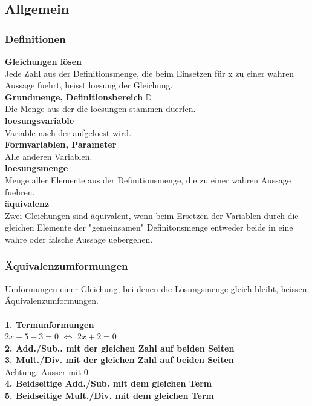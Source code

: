 \begin{multicols}{2}
    \subsection{Allgemein}
    \vspace{-4mm}
    \subsubsection{Definitionen}
    \vspace{-4mm}
    \textbf{Gleichungen lösen} \\
    Jede Zahl aus der Definitionsmenge, die beim Einsetzen für x zu einer wahren Aussage fuehrt, heisst loesung der Gleichung. \\
    \textbf{Grundmenge, Definitionsbereich} $\mathbb{D}$ \\
    Die Menge aus der die loesungen stammen duerfen. \\
    \textbf{loesungsvariable} \\
    Variable nach der aufgeloest wird. \\
    \textbf{Formvariablen, Parameter} \\
    Alle anderen Variablen. \\
    \textbf{loesungsmenge} \\
    Menge aller Elemente aus der Definitionsmenge, die zu einer wahren Aussage fuehren. \\
    \textbf{äquivalenz} \\
    Zwei Gleichungen sind äquivalent, wenn beim Ersetzen der Variablen durch die gleichen Elemente der "gemeinsamen" Definitonsmenge entweder beide in eine wahre oder falsche Aussage uebergehen.

    \subsubsection{Äquivalenzumformungen}
    \vspace{-4mm}
    Umformungen einer Gleichung, bei denen die Lösungsmenge gleich bleibt, heissen Äquivalenzumformungen.\\~\\
    \textbf{1. Termunformungen}\\
    $2x+5-3=0$ $\Longleftrightarrow$ $2x +2 = 0$ \\
    \textbf{2. Add./Sub.. mit der gleichen Zahl auf beiden Seiten} \\
    \textbf{3. Mult./Div. mit der gleichen Zahl auf beiden Seiten} \\
    Achtung: Ausser mit 0 \\
    \textbf{4. Beidseitige Add./Sub. mit dem gleichen Term} \\
    \textbf{5. Beidseitige Mult./Div. mit dem gleichen Term}


\end{multicols}
